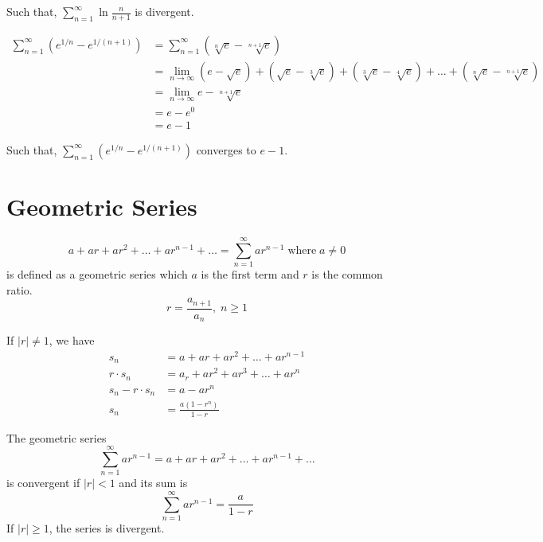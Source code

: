 Such that, $\sum_{n=1}^{\infty} \ln{\frac{n}{n + 1}}$ is divergent.

\begin{equation}
  \nonumber
  \begin{aligned}
    \sum_{n=1}^{\infty} (e^{1/n} - e^{1/(n + 1)}) &= \sum_{n=1}^{\infty}(\sqrt[n]{e} - \sqrt[n + 1]{e}) \\
    &= \lim_{n \to \infty} (e - \sqrt{e}) + (\sqrt{e} - \sqrt[3]{e}) + (\sqrt[3]{e} - \sqrt[4]{e}) + \dots + (\sqrt[n]{e} - \sqrt[n + 1]{e})\\
    &= \lim_{n \to \infty} e - \sqrt[n + 1]{e} \\
    &= e - e^{0} \\
    &= e - 1
  \end{aligned}
\end{equation}

Such that, $\sum_{n=1}^{\infty} (e^{1/n} - e^{1/(n + 1)})$ converges to $e - 1$.

\section{Geometric Series}

\begin{definition}
  \[
    a + ar + ar^{2} + \dots + ar^{n-1} + \dots = \sum_{n = 1}^{\infty} ar^{n-1} \; \text{where} \; a \neq 0
  \]
  is defined as a geometric series which \(a\) is the first term and \(r\) is the common ratio.
  \[
    r = \frac{a_{n+1}}{a_{n}}, \; n \geq 1
  \]
\end{definition}

\begin{lemma}
  If \(|r| \neq 1\), we have
  \begin{equation}
    \nonumber
    \begin{aligned}
      s_{n} &= a + ar + ar^{2} + \dots + ar^{n - 1} \\
      r \cdot s_{n} &= a_r + ar^{2} + ar^{3} + \dots + ar^{n} \\
      s_{n} - r \cdot s_{n} &= a - ar^{n} \\
      s_{n} &= \frac{a(1 - r^{n})}{1 - r}
    \end{aligned}
  \end{equation}
\end{lemma}

\begin{lemma}
  The geometric series
  \[
    \sum_{n = 1}^{\infty} ar^{n-1} = a + ar + ar^{2} + \dots + ar^{n-1} + \dots
  \]
  is convergent if \(|r| < 1\) and its sum is
  \[
    \sum_{n = 1}^{\infty} ar^{n-1} = \frac{a}{1 - r}  
  \]
  If \(|r| \geq 1\), the series is divergent.
\end{lemma}

